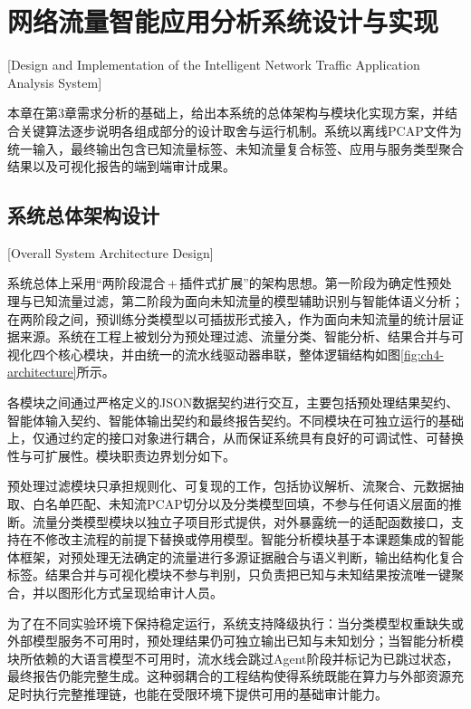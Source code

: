 \chapter{网络流量智能应用分析系统设计与实现}[Design and Implementation of the Intelligent Network Traffic Application Analysis System]

本章在第3章需求分析的基础上，给出本系统的总体架构与模块化实现方案，并结合关键算法逐步说明各组成部分的设计取舍与运行机制。系统以离线PCAP文件为统一输入，最终输出包含已知流量标签、未知流量复合标签、应用与服务类型聚合结果以及可视化报告的端到端审计成果。

\section{系统总体架构设计}[Overall System Architecture Design]

系统总体上采用“两阶段混合\,+\,插件式扩展”的架构思想。第一阶段为确定性预处理与已知流量过滤，第二阶段为面向未知流量的模型辅助识别与智能体语义分析；在两阶段之间，预训练分类模型以可插拔形式接入，作为面向未知流量的统计层证据来源。系统在工程上被划分为预处理过滤、流量分类、智能分析、结果合并与可视化四个核心模块，并由统一的流水线驱动器串联，整体逻辑结构如图\ref{fig:ch4-architecture}所示。

\begin{figure}[h]
	\centering
\end{figure}

各模块之间通过严格定义的JSON数据契约进行交互，主要包括预处理结果契约、智能体输入契约、智能体输出契约和最终报告契约。不同模块在可独立运行的基础上，仅通过约定的接口对象进行耦合，从而保证系统具有良好的可调试性、可替换性与可扩展性。模块职责边界划分如下。

预处理过滤模块只承担规则化、可复现的工作，包括协议解析、流聚合、元数据抽取、白名单匹配、未知流PCAP切分以及分类模型回填，不参与任何语义层面的推断。流量分类模型模块以独立子项目形式提供，对外暴露统一的适配函数接口，支持在不修改主流程的前提下替换或停用模型。智能分析模块基于本课题集成的智能体框架，对预处理无法确定的流量进行多源证据融合与语义判断，输出结构化复合标签。结果合并与可视化模块不参与判别，只负责把已知与未知结果按流唯一键聚合，并以图形化方式呈现给审计人员。

为了在不同实验环境下保持稳定运行，系统支持降级执行：当分类模型权重缺失或外部模型服务不可用时，预处理结果仍可独立输出已知与未知划分；当智能分析模块所依赖的大语言模型不可用时，流水线会跳过Agent阶段并标记为已跳过状态，最终报告仍能完整生成。这种弱耦合的工程结构使得系统既能在算力与外部资源充足时执行完整推理链，也能在受限环境下提供可用的基础审计能力。

